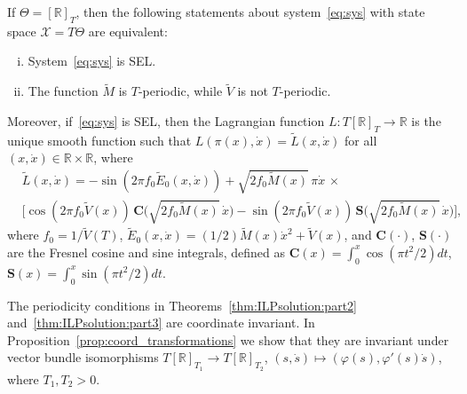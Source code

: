 \begin{theorem}\label{thm:ILPsolution:part3}
	If $\Theta = [\mathbb{R}]_T$, then the following statements about
	system~\eqref{eq:sys} with state space $\mathcal{X} = T \Theta$ are equivalent:
	\begin{enumerate}[(i)]
		
		\item System~\eqref{eq:sys} is SEL.
		
		\item The function $\tilde M$ is $T$-periodic, while $\tilde V$ is not
		$T$-periodic.
	\end{enumerate}
	
	Moreover, if~\eqref{eq:sys} is SEL, then the Lagrangian function $L :
	T[\mathbb{R}]_T \to \mathbb{R}$ is the unique smooth function such that
	$L(\pi(x),\dot x) = \tilde L(x,\dot x)$ for all $(x,\dot x) \in \mathbb{R}
	\times \mathbb{R}$, where
				\begin{equation}\label{eq:Lagrangian:SEL}
	\begin{aligned}
	&\tilde L(x,\dot x) = - \sin(2 \pi f_0 \tilde E_0(x,\dot x)) +
	\sqrt{2f_0\tilde{M}(x)} \, \pi\dot{x} \, \times \\
		&\Bigg[\cos(2\pi
	f_0\tilde{V}(x))\, \mathbf{C}\Big(\sqrt{2f_0\tilde{M}(x)}\,\dot{x}\Big)-\sin(2\pi
	f_0\tilde{V}(x))\, \mathbf{S}\Big(\sqrt{2f_0\tilde{M}(x)}\, \dot{x}\Big)\Bigg],
	\end{aligned}
	\end{equation}
				where $f_0 = 1 / \tilde V(T)$, $\tilde E_0(x,\dot x) = (1/2) \tilde
	M(x) \dot x^2 + \tilde V(x)$, and $\mathbf{C}(\cdot)$, $\mathbf{S}(\cdot)$ are the
	Fresnel cosine and sine integrals, defined as $\mathbf{C}(x) = \int_0^x
	\cos(\pi t^2/2) dt$, $\mathbf{S}(x) = \int_0^x \sin(\pi t^2/2) dt$.
\end{theorem}
\begin{remark}
	The periodicity conditions in Theorems~\ref{thm:ILPsolution:part2}
	and~\ref{thm:ILPsolution:part3} are coordinate invariant. In
	Proposition~\ref{prop:coord_transformations} we show that they are
	invariant under vector bundle isomorphisms $T[\mathbb{R}]_{T_1} \to T[\mathbb{R}]_{T_2}$,
	$(s,\dot s) \mapsto (\varphi(s),\varphi'(s)\dot s)$, where
	$T_1,T_2>0$.
\end{remark}
